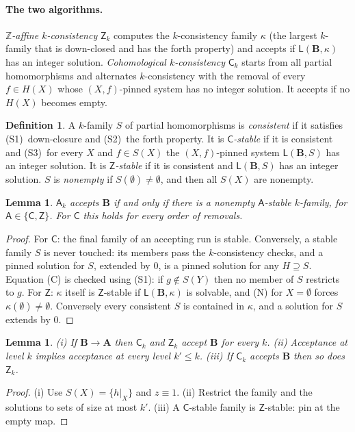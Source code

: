 \documentclass[11pt]{article}
\newtheorem{lemma}[theorem]{Lemma}
\theoremstyle{definition}
\newtheorem{definition}[theorem]{Definition}
\theoremstyle{remark}
\newcommand{\Coh}{\mathsf{C}}
\newcommand{\Aff}{\mathsf{Z}}
\newcommand{\Z}{\mathbb Z}
\begin{document}
\paragraph{The two algorithms.} \emph{$\Z$-affine $k$-consistency} $\Aff_k$
\cite{DO24,LP25} computes the $k$-consistency family $\kappa$ (the largest
$k$-family that is down-closed and has the forth property) and accepts if
$\mathsf L(\mathbf B,\kappa)$ has an integer solution. \emph{Cohomological
$k$-consistency} $\Coh_k$ \cite{OC22,LP25} starts from all partial
homomorphisms and alternates $k$-consistency with the removal of every $f\in
H(X)$ whose $(X,f)$-pinned system has no integer solution. It accepts if no
$H(X)$ becomes empty.

\begin{definition}
A $k$-family $S$ of partial homomorphisms is \emph{consistent} if it satisfies
(S1)~down-closure and (S2)~the forth property. It is \emph{$\Coh$-stable} if it
is consistent and
(S3)~for every $X$ and $f\in S(X)$ the $(X,f)$-pinned system $\mathsf
L(\mathbf B,S)$ has an integer solution. It is \emph{$\Aff$-stable} if it is
consistent and $\mathsf L(\mathbf B,S)$ has an integer solution. $S$ is
\emph{nonempty} if $S(\emptyset)\ne\emptyset$, and then all $S(X)$ are nonempty.
\end{definition}

\begin{lemma}\label{lem:stable}
$\mathsf A_k$ accepts $\mathbf B$ if and only if there is a nonempty
$\mathsf A$-stable $k$-family, for $\mathsf A\in\{\Coh,\Aff\}$. For $\Coh$
this holds for every order of removals.
\end{lemma}
\begin{proof}
For $\Coh$: the final family of an accepting run is stable. Conversely, a stable
family $S$ is never touched: its members pass the $k$-consistency checks, and a
pinned solution for $S$, extended by $0$, is a pinned solution for any $H\supseteq
S$. Equation (C) is checked using (S1): if $g\notin S(Y)$ then no member of $S$
restricts to $g$. For $\Aff$: $\kappa$ itself is $\Aff$-stable if $\mathsf
L(\mathbf B,\kappa)$ is solvable, and (N) for $X=\emptyset$ forces
$\kappa(\emptyset)\neq\emptyset$. Conversely every consistent $S$ is contained in
$\kappa$, and a solution for $S$ extends by $0$.
\end{proof}

\begin{lemma}\label{lem:basic}
(i) If $\mathbf B\to\mathbf A$ then $\Coh_k$ and $\Aff_k$ accept $\mathbf B$
for every $k$. (ii) Acceptance at level $k$ implies acceptance at every level
$k'\le k$. (iii) If $\Coh_k$ accepts $\mathbf B$ then so does $\Aff_k$.
\end{lemma}
\begin{proof}
(i) Use $S(X)=\{h|_X\}$ and $z\equiv1$. (ii) Restrict the family and the
solutions to sets of size at most $k'$. (iii) A $\Coh$-stable family is
$\Aff$-stable: pin at the empty map.
\end{proof}
\end{document}
